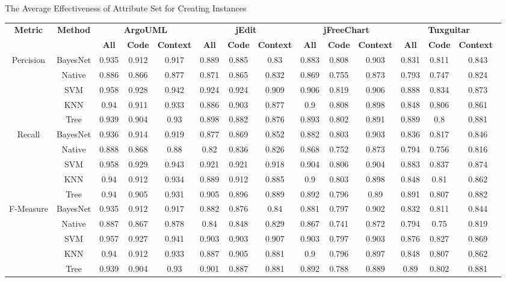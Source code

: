 {\begin{table*}[htbp]
{The Average Effectiveness of Attribute Set for Creating Instances}
\vspace{0.5em}
\centering
\scriptsize
\begin{tabular}{cccccccccccccc}
\toprule[1.5pt]
\multirow{2}{*}{\textbf{Metric}}&\multirow{2}{*}{\textbf{Method}}&\multicolumn{3}{c}{\textbf{ArgoUML}}&\multicolumn{3}{c}{\textbf{jEdit}}&\multicolumn{3}{c}{\textbf{jFreeChart}}&\multicolumn{3}{c}{\textbf{Tuxguitar}}\\
\cline{3-14}
&&\textbf{All}&\textbf{Code}&\textbf{Context}&\textbf{All}&\textbf{Code}&\textbf{Context}&\textbf{All}&\textbf{Code}&\textbf{Context}&\textbf{All}&\textbf{Code}&\textbf{Context}~\\
\midrule[1pt]
\multirow{5}{*}{Percision}
&BayesNet&	0.935&	0.912&	0.917&		0.889&	0.885&	0.83&		0.883&	0.808&	0.903&		0.831&	0.811&	0.843\\
&Native&	0.886&	0.866&	0.877&		0.871&	0.865&	0.832&		0.869&	0.755&	0.873&		0.793&	0.747&	0.824\\
&SVM&	0.958&	0.928&	0.942&		0.924&	0.924&	0.909&		0.906&	0.819&	0.906&		0.888&	0.834&	0.873\\
&KNN&	0.94&	0.911&	0.933&		0.886&	0.903&	0.877&		0.9	&0.808&	0.898&		0.848&	0.806&	0.861\\
&Tree&	0.939&	0.904&	0.93&		0.898&	0.882&	0.876&		0.893&	0.802&	0.891&		0.889&	0.8&	0.881\\
\hline
\multirow{5}{*}{Recall}
&BayesNet&	0.936&	0.914&	0.919&		0.877&	0.869&	0.852&		0.882&	0.803&	0.903&		0.836&	0.817&	0.846\\
&Native&	0.888&	0.868&	0.88&		0.82&	0.836&	0.826&		0.868&	0.752&	0.873&		0.794&	0.756&	0.816\\
&SVM&	0.958&	0.929&	0.943&		0.921&	0.921&	0.918&		0.904&	0.806&	0.904&		0.883&	0.837&	0.874\\
&KNN&	0.94&	0.912&	0.934&		0.889&	0.912&	0.885&		0.9&	0.803&	0.898&		0.848&	0.81&	0.862\\
&Tree&	0.94&	0.905&	0.931&		0.905&	0.896&	0.889&		0.892&	0.796&	0.89&		0.891&	0.807&	0.882\\
\hline
\multirow{5}{*}{F-Measure}
&BayesNet&	0.935&	0.912&	0.917&		0.882&	0.876&	0.84&		0.881&	0.797&	0.902&		0.832&	0.811&	0.844\\
&Native&	0.887&	0.867&	0.878&		0.84&	0.848&	0.829&		0.867&	0.741&	0.872&		0.794&	0.75&	0.819\\
&SVM&	0.957&	0.927&	0.941&		0.903&	0.903&	0.907&		0.903&	0.797&	0.903&		0.876&	0.827&	0.869\\
&KNN&	0.94&	0.912&	0.933&		0.887&	0.905&	0.881&		0.9&	0.796&	0.897&		0.848&	0.807&	0.862\\
&Tree&	0.939&	0.904&	0.93&		0.901&	0.887&	0.881&		0.892&	0.788&	0.889&		0.89&	0.802&	0.881\\
\bottomrule[1.5pt]
\end{tabular}
\end{table*}


}
